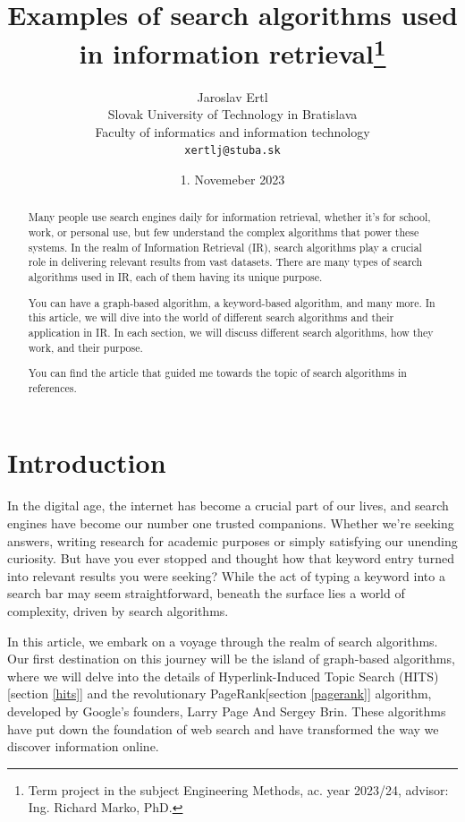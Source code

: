 \documentclass[10pt,english,a4paper]{article}
\title{Examples of search algorithms used in information retrieval\thanks{Term project in the subject Engineering Methods, ac. year 2023/24, advisor: Ing. Richard Marko, PhD.}}
\author{Jaroslav Ertl\\[2pt]
	{\small Slovak University of Technology in Bratislava}\\
	{\small Faculty of informatics and information technology}\\
	{\small \texttt{xertlj@stuba.sk}}
	}
\date{\small 1. Novemeber 2023}
\begin{document}
\maketitle
  
\begin{abstract}
    Many people use search engines daily for information retrieval, whether it's for school, work, or personal use, but few understand the complex algorithms that power these systems.  In the realm of Information Retrieval (IR), search algorithms play a crucial role in delivering relevant results from vast datasets. There are many types of search algorithms used in IR, each of them having its unique purpose. 

  You can have a graph-based algorithm, a keyword-based algorithm, and many more. In this article, we will dive into the world of different search algorithms and their application in IR. In each section, we will discuss different search algorithms, how they work, and their purpose.
    
You can find the article that guided me towards the topic of search algorithms in references.\cite{prime_article}
\end{abstract}
\section{Introduction}
In the digital age, the internet has become a crucial part of our lives, and search engines have become our number one trusted companions. Whether we're seeking answers, writing research for academic purposes or simply satisfying our unending curiosity. But have you ever stopped and thought how that keyword entry turned into relevant results you were seeking? While the act of typing a keyword into a search bar may seem straightforward, beneath the surface lies a world of complexity, driven by search algorithms. 

In this article, we embark on a voyage through the realm of search algorithms. Our first destination on this journey will be the island of graph-based algorithms, where we will delve into the details of Hyperlink-Induced Topic Search (HITS)[section \ref{hits}] and the revolutionary PageRank[section \ref{pagerank}] algorithm, developed by Google's founders, Larry Page And Sergey Brin. These algorithms have put down the foundation of web search and have transformed the way we discover information online. 
\end{document}
